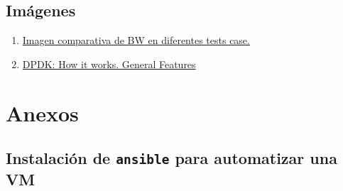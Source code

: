 \documentclass[12pt]{article}
\begin{document}
	\subsection{Imágenes}
	\begin{enumerate}
		\item 
		\label{bib:img1}\href{https://www.accton.com/Technology-Brief/intel-dpdk-performance-on-the-sau5081i-server/}{Imagen comparativa de BW en diferentes tests case.}
		
		\item
		\label{bib:img2} \href{https://blog.selectel.com/introduction-dpdk-architecture-principles/}{DPDK: How it works. General Features}
		
		
	\end{enumerate}

	\pagebreak
	
	\appendix

	\section{Anexos}
	
	\subsection{Instalación de \texttt{ansible} para automatizar una VM}
	
\end{document}
